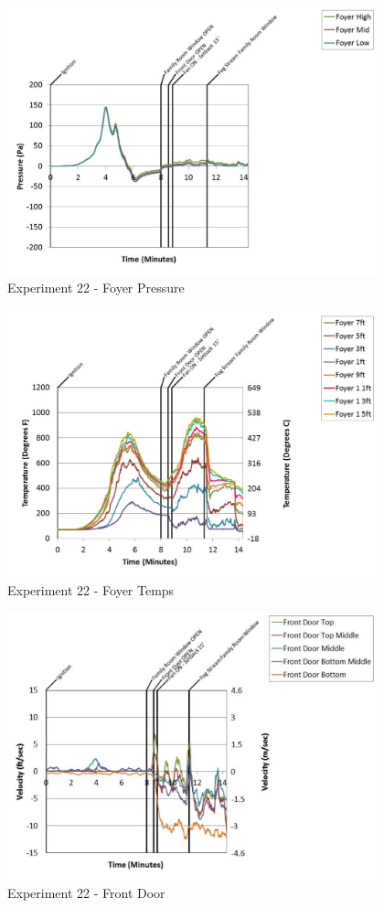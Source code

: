 \documentclass{article}
\begin{document}
\begin{appendices}
	\begin{figure}[h!]
		\centering
		\includegraphics[height=3.05in]{0_Images/Results_Charts/Exp_22_Charts/FoyerPressure.pdf}
		\caption{Experiment 22 - Foyer Pressure}
	\end{figure}
 
	\clearpage

	\begin{figure}[h!]
		\centering
		\includegraphics[height=3.05in]{0_Images/Results_Charts/Exp_22_Charts/FoyerTemps.pdf}
		\caption{Experiment 22 - Foyer Temps}
	\end{figure}
 

	\begin{figure}[h!]
		\centering
		\includegraphics[height=3.05in]{0_Images/Results_Charts/Exp_22_Charts/FrontDoor.pdf}
		\caption{Experiment 22 - Front Door}
	\end{figure}
 

\end{appendices}
\end{document}
